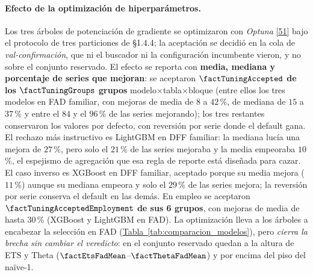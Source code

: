 \documentclass[12pt,letterpaper]{report}
\newcommand{\cita}[1]{\hyperref[bib:#1]{[#1]}}
\begin{document}
\paragraph{Efecto de la optimización de hiperparámetros.} Los tres árboles de potenciación de
gradiente se optimizaron con \textit{Optuna} \cita{51} bajo el protocolo de tres particiones de
§1.4.4; la aceptación se decidió en la cola de \textit{val-confirmación}, que ni el buscador ni
la configuración incumbente vieron, y no sobre el conjunto reservado. El efecto se reporta con
\textbf{media, mediana y porcentaje de series que mejoran}: se aceptaron
\textbf{$\factTuningAccepted$ de los $\factTuningGroups$ grupos}
modelo$\times$tabla$\times$bloque (entre ellos los tres modelos en FAD familiar, con mejoras de
media de $8$ a $42$\,\%, de mediana de $15$ a $37$\,\% y entre el $84$ y el $96$\,\% de las
series mejorando); los tres restantes conservaron los valores por defecto, con reversión por
serie donde el default gana. El rechazo más instructivo es LightGBM en DFF familiar: la mediana
lucía una mejora de $27$\,\%, pero solo el $21$\,\% de las series mejoraba y la media empeoraba
$10$\,\%, el espejismo de agregación que esa regla de reporte está diseñada para cazar. El caso
inverso es XGBoost en DFF familiar, aceptado porque su media mejora ($11$\,\%) aunque su mediana
empeora y solo el $29$\,\% de las series mejora; la reversión por serie conserva el default en
las demás. En empleo se aceptaron \textbf{$\factTuningAcceptedEmployment$ de sus 6 grupos}, con
mejoras de media de hasta $30$\,\% (XGBoost y LightGBM en FAD). La optimización lleva a los
árboles a encabezar la selección en FAD (\hyperref[tab:comparacion_modelos]{Tabla~\ref*{tab:comparacion_modelos}}), pero
\textit{cierra la brecha sin cambiar el veredicto}: en el conjunto reservado quedan a la altura
de ETS y Theta ($\factEtsFadMean$--$\factThetaFadMean$) y por encima del piso del naïve-1.
\end{document}
